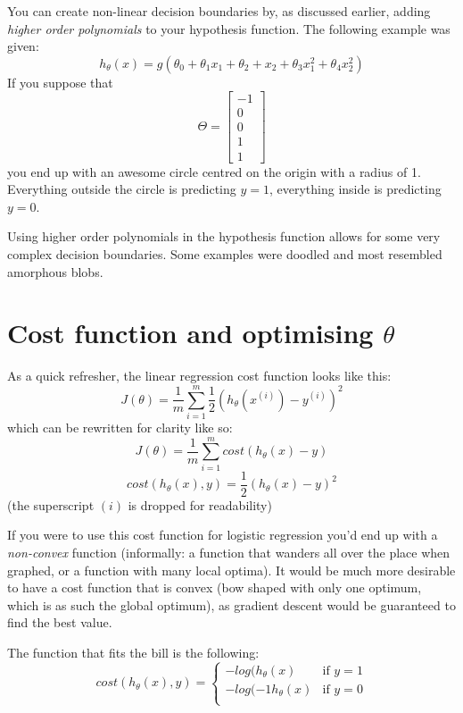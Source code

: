 You can create non-linear decision boundaries by, as discussed earlier, adding \emph{higher order polynomials} to your hypothesis function. The following example was given:
\[
h_\theta(x) = g(\theta_0 + \theta_1x_1 + \theta_2+x_2 + \theta_3x_1^2 + \theta_4x_2^2)
\]
If you suppose that 
\[
\Theta =
\left[
\begin{array}{c}
	-1\\
	0\\
	0\\
	1\\
	1
\end{array}
\right]
\]
you end up with an awesome circle centred on the origin with a radius of 1. Everything outside the circle is predicting $y = 1$, everything inside is predicting $y = 0$.

Using higher order polynomials in the hypothesis function allows for some very complex decision boundaries. Some examples were doodled and most resembled amorphous blobs.

\section{Cost function and optimising $\theta$}

As a quick refresher, the linear regression cost function looks like this:
\begin{equation}
J(\theta) = \frac{1}{m}\sum^m_{i = 1}\frac{1}{2}
(h_\theta(x^{(i)}) - y^{(i)})^2
\end{equation}
which can be rewritten for clarity like so:
\[
J(\theta) = \frac{1}{m}\sum^m_{i = 1}cost(h_\theta(x) - y)
\]
\[
cost(h_\theta(x), y) = \frac{1}{2}(h_\theta(x) - y)^2
\]
(the superscript $(i)$ is dropped for readability)

If you were to use this cost function for logistic regression you'd end up with a \emph{non-convex} function (informally: a function that wanders all over the place when graphed, or a function with many local optima). It would be much more desirable to have a cost function that is convex (bow shaped with only one optimum, which is as such the global optimum), as gradient descent would be guaranteed to find the best value.

The function that fits the bill is the following:
\begin{equation}
cost(h_\theta(x), y) = \begin{cases}
    -log(h_\theta(x) & \text{if $y = 1$}\\
    -log(-1 h_\theta(x) & \text{if $y = 0$}\\
	\end{cases}
\end{equation}

